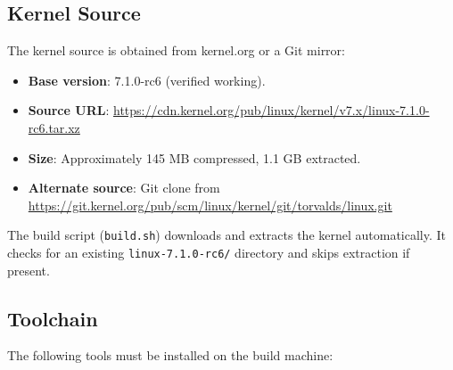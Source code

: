 \subsection{Kernel Source}

The kernel source is obtained from kernel.org or a Git mirror:

\begin{itemize}[nosep]
  \item \textbf{Base version}: 7.1.0-rc6 (verified working).
  \item \textbf{Source URL}: \url{https://cdn.kernel.org/pub/linux/kernel/v7.x/linux-7.1.0-rc6.tar.xz}
  \item \textbf{Size}: Approximately 145 MB compressed, 1.1 GB extracted.
  \item \textbf{Alternate source}: Git clone from \url{https://git.kernel.org/pub/scm/linux/kernel/git/torvalds/linux.git}
\end{itemize}

The build script (\texttt{build.sh}) downloads and extracts the kernel
automatically. It checks for an existing \texttt{linux-7.1.0-rc6/} directory
and skips extraction if present.

\subsection{Toolchain}

The following tools must be installed on the build machine:

